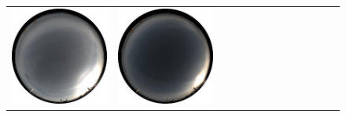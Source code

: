 \documentclass{report}
\begin{document}
\begin{figure}[!th]
\begin{tabular}{@{}rcccccccccccc@{}}
    \includegraphics[width=\customwidth]{./figures/database/20141108_160025.jpg} &
    \includegraphics[width=\customwidth]{./figures/database/20141108_163025.jpg}


\end{tabular}
\end{figure}
\end{document}
